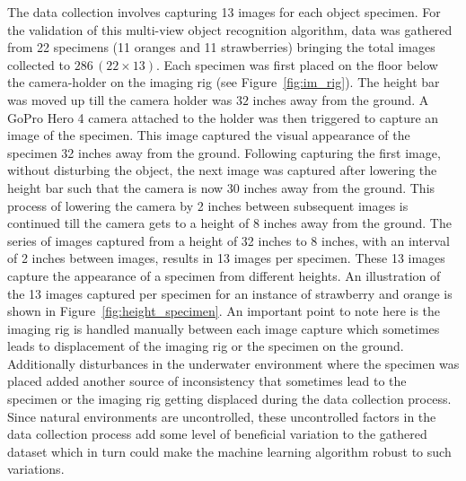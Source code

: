 \documentclass {udthesis}
\begin{document}
The data collection involves capturing 13 images for each object specimen. For the validation of this multi-view object recognition algorithm, data was gathered from 22 specimens (11 oranges and 11 strawberries) bringing the total images collected to $286\, (22 \times 13)$. Each specimen was first placed on the floor below the camera-holder on the imaging rig (see Figure~\ref{fig:im_rig}). The height bar was moved up till the camera holder was $32$ inches away from the ground. A GoPro Hero 4 camera attached to the holder was then triggered to capture an image of the specimen. This image captured the visual appearance of the specimen 32 inches away from the ground. Following capturing the first image, without disturbing the object, the next image was captured after lowering the height bar such that the camera is now $30$ inches away from the ground.
This process of lowering the camera by 2 inches between subsequent images is continued till the camera gets to a height of $8$ inches away from the ground. 
The series of images captured from a height of 32 inches to 8 inches, with an interval of 2 inches between images, results in 13 images per specimen. 
These 13 images capture the appearance of a specimen from different heights. An illustration of the 13 images captured per specimen for an instance of strawberry and orange is shown in Figure~\ref{fig:height_specimen}. An important point to note here is the imaging rig is handled manually between each image capture which sometimes leads to displacement of the imaging rig or the specimen on the ground. 
Additionally disturbances in the underwater environment where the specimen was placed added another source of inconsistency that sometimes lead to the specimen or the imaging rig getting displaced during the data collection process. 
Since natural environments are uncontrolled, these uncontrolled factors in the data collection process add some level of beneficial variation to the gathered dataset which in turn could make the machine learning algorithm robust to such variations.
\end{document}
